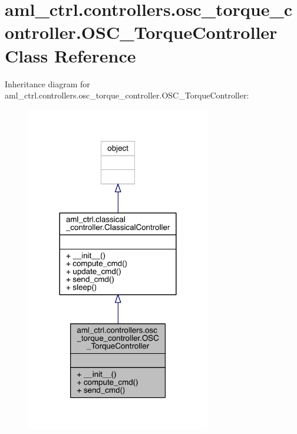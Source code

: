 \hypertarget{classaml__ctrl_1_1controllers_1_1osc__torque__controller_1_1_o_s_c___torque_controller}{}\section{aml\+\_\+ctrl.\+controllers.\+osc\+\_\+torque\+\_\+controller.\+O\+S\+C\+\_\+\+Torque\+Controller Class Reference}
\label{classaml__ctrl_1_1controllers_1_1osc__torque__controller_1_1_o_s_c___torque_controller}


Inheritance diagram for aml\+\_\+ctrl.\+controllers.\+osc\+\_\+torque\+\_\+controller.\+O\+S\+C\+\_\+\+Torque\+Controller\+:
\nopagebreak
\begin{figure}[H]
\begin{center}
\leavevmode
\includegraphics[width=228pt]{classaml__ctrl_1_1controllers_1_1osc__torque__controller_1_1_o_s_c___torque_controller__inherit__graph}
\end{center}
\end{figure}


